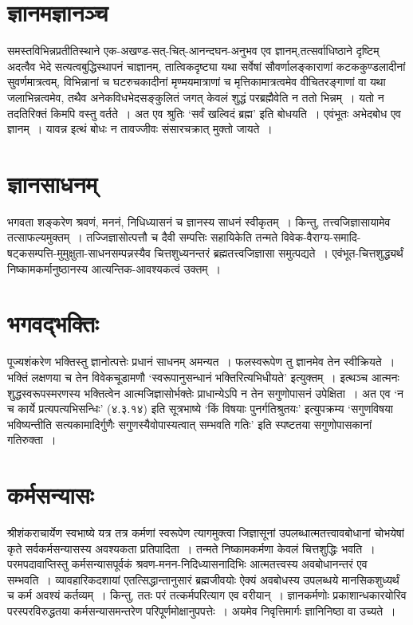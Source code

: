 {\section*{ज्ञानमज्ञानञ्च}

समस्तविभिन्नप्रतीतिस्थाने एक-अखण्ड-सत्-चित्-आनन्दघन-अनुभव एव ज्ञानम्,\break तत्सर्वाधिष्ठाने दृष्टिम् अदत्वैव भेदे सत्यत्वबुद्धिस्थापनं चाज्ञानम्, तात्विकदृष्ट्या यथा सर्वेषां सौवर्णालङ्काराणां कटककुण्डलादीनां सुवर्णमात्रत्वम्, विभिन्नानां च घटरुचकादीनां मृण्मयमात्राणां च मृत्तिकामात्रत्वमेव वीचितरङ्गाणां वा यथा जलाभिन्नत्वमेव, तथैव अनेकविध\-भेदसङ्कुलितं जगत् केवलं शुद्धं परब्रह्मैवेति न ततो भिन्नम्~। यतो न तदतिरिक्तं किमपि वस्तु वर्तते~। अत एव श्रुतिः ‘सर्वं खल्विदं ब्रह्म’ इति बोधयति~। एवंभूतः अभेदबोध एव ज्ञानम्~। यावन्न इत्थं बोधः न तावज्जीवः संसारचक्रात् मुक्तो जायते~। 

\section*{ज्ञानसाधनम्}

भगवता शङ्करेण श्रवणं, मननं, निधिध्यासनं च ज्ञानस्य साधनं स्वीकृतम्~। किन्तु, तत्त्वजिज्ञासायामेव तत्साफल्यमुक्तम्~। तज्जिज्ञासोत्पत्तौ च दैवी सम्पत्तिः सहायिकेति तन्मते विवेक-वैराग्य-समादि-षट्कसम्पत्ति-मुमुक्षुता-साधनसम्पन्नस्यैव चित्तशुध्यनन्तरं ब्रह्मतत्त्वजिज्ञासा समुत्पद्यते~। एवंभूत-चित्तशुद्ध्यर्थं निष्कामकर्मानुष्ठानस्य आत्यन्तिक-आवश्यकत्वं उक्तम्~। 
\newpage

\section*{भगवद्भक्तिः}

पूज्यशंकरेण भक्तिस्तु ज्ञानोत्पत्तेः प्रधानं साधनम् अमन्यत~। फलस्वरूपेण तु ज्ञानमेव तेन स्वीक्रियते~। भक्तिं लक्षणया च तेन विवेकचूडामणौ ‘स्वरूपानुसन्धानं भक्तिरित्यभिधीयते’ इत्युक्तम्~। इत्थञ्च आत्मनः शुद्धस्वरूपस्मरणस्य भक्तित्वेन आत्मजिज्ञासोर्भक्तेः प्राधान्येऽपि न तेन सगुणोपासनं उपेक्षिता~। अत एव ‘न च कार्ये प्रत्यपत्यभिसन्धिः’ (४.३.१४) इति सूत्रभाष्ये ‘किं विषयाः पुनर्गतिश्रुतयः’ इत्युपक्रम्य ‘सगुणविषया भविष्यन्तीति सत्यकामादिर्गुणैः सगुणस्यैवोपास्यत्वात् सम्भवति गतिः’ इति स्पष्टतया सगुणोपासकानां गतिरुक्ता~। 

\section*{कर्मसन्यासः}

श्रीशंकराचार्येण स्वभाष्ये यत्र तत्र कर्मणां स्वरूपेण त्यागमुक्त्वा जिज्ञासूनां उपलब्धात्मतत्त्वावबोधानां चोभयेषां कृते सर्वकर्मसन्यासस्य अवश्यकता प्रतिपादिता~। तन्मते निष्काम\-कर्मणा केवलं चित्तशुद्धिः भवति~। परमपदावाप्तिस्तु कर्मसन्यासपूर्वकं श्रवण-मनन-निदिध्या\-सनादिभिः आत्मतत्त्वस्य अवबोधानन्तरं एव सम्भवति~। व्यावहारिकदशायां एतत्सिद्धान्तानुसारं ब्रह्मजीवयोः ऐक्यं अवबोधस्य उपलब्धये मानसिकशुध्यर्थं च कर्म अवश्यं कर्तव्यम्~। किन्तु, ततः परं तत्कर्मपरित्याग एव वरीयान्~। ज्ञानकर्मणोः प्रकाशान्धकारयोरिव परस्परविरुद्धतया कर्मसन्यासमन्तरेण परिपूर्णमोक्षानुपपत्तेः~। अयमेव निवृत्तिमार्गः ज्ञानिनिष्ठा वा उच्यते~। 

}
